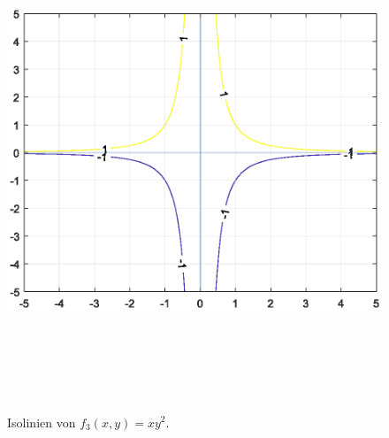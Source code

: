 {\begin{figure}[ht]
\begin{center}
\includegraphics[width=15cm, height=15cm]{../A/analysis/isolines_and_isosurfaces_001_aiii.eps}
\caption{Isolinien von $f_3(x,y) = xy^2$.}
\label{f_3}
\end{center}
\end{figure}

}
